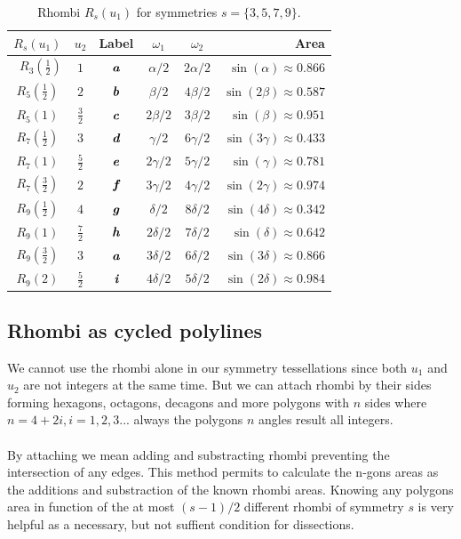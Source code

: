 \documentclass[11pt]{article}
\def\mathbi#1{\textbf{\em #1}}
\begin{document}
\begin{table}[h]
\begin{center}
\begin{tabular}{|c|c|c|c c| r |}
\hline
$R_s(u_1)$ & $u_2$ & Label & $\omega_1$ & $\omega_2$ & Area \\ \hline\
$R_3(\frac{1}2)$ & $1$  & $\mathbi{a}$ & $\alpha/2$ & $2\alpha/2$  & $\sin(\alpha) \approx 0.866$ \\[0.5ex]
\hline
$R_5(\frac{1}2)$ & $2$  & $\mathbi{b}$ & $\beta/2$  & $4\beta/2$   & $\sin(2\beta) \approx 0.587$\\[0.5ex]
$R_5(1)$ & $\frac{3}2$  & $\mathbi{c}$ & $2\beta/2$ & $3\beta/2$   & $\sin(\beta) \approx 0.951$\\[0.5ex]
\hline
$R_7(\frac{1}2)$ & $3$  & $\mathbi{d}$ & $\gamma/2$ & $6\gamma/2$  & $\sin(3\gamma) \approx 0.433$\\[0.5ex]
$R_7(1)$ & $\frac{5}2$ & $\mathbi{e}$ & $2\gamma/2$ & $5\gamma/2$ & $\sin(\gamma) \approx 0.781$\\[0.5ex]
$R_7(\frac{3}2)$ & $2$  & $\mathbi{f}$ & $3\gamma/2$ & $4\gamma/2$ & $\sin(2\gamma) \approx 0.974$\\[0.5ex]
\hline
$R_9(\frac{1}2)$ & $4$ & $\mathbi{g}$ & $\delta/2$ & $8\delta/2$  & $\sin(4\delta) \approx 0.342$\\[0.5ex]
$R_9(1)$ & $\frac{7}2$ & $\mathbi{h}$ & $2\delta/2$ & $7\delta/2$ & $\sin(\delta) \approx 0.642$\\[0.5ex]
$R_9(\frac{3}2)$ & $3$ & $\mathbi{a}$ & $3\delta/2$ & $6\delta/2$ & $\sin(3\delta) \approx 0.866$\\[0.5ex]
$R_9(2)$ & $\frac{5}2$ & $\mathbi{i}$ & $4\delta/2$ & $5\delta/2$ & $\sin(2\delta) \approx 0.984$\\[0.5ex]
\hline
\end{tabular}
\caption{Rhombi $R_s(u_1)$ for symmetries $s=\{3,5,7,9\}$.} 
\label{tbl:rhombi}
\end{center}
\end{table}

\subsection{Rhombi as cycled polylines}

We cannot use the rhombi alone in our symmetry tessellations since both $u_1$ and $u_2$ are not integers at the same time. But we can attach rhombi by their sides forming hexagons, octagons, decagons and more polygons with $n$ sides where $n=4+2i, i=1,2,3...$ always the polygons $n$ angles result all integers.
\\\\
By attaching we mean adding and substracting rhombi preventing the intersection of any edges. This method permits to calculate the n-gons areas as the additions and substraction of the known rhombi areas. Knowing any polygons area in function of the at most $(s-1)/2$ different rhombi of symmetry $s$ is very helpful as a necessary, but not suffient condition for dissections.
\end{document}
